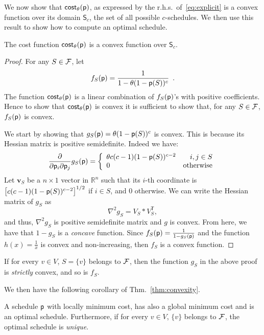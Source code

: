We now show that $\mathsf{cost}_\theta(\mathsf{p})$, as expressed by the r.h.s.~of~\eqref{eq:explicit}
is a convex function over its domain $\mathsf{S}_c$, the set of all possible
$c$-schedules. We then use this result to show how to compute an optimal schedule.

\begin{theorem}\label{thm:convexity}
	The cost function $\mathsf{cost}_\theta(\mathsf{p})$ is a convex function over
	$\mathsf{S}_c$.
\end{theorem}
\begin{proof}
	For any $S\in\mathcal{F}$, let
	\[
		f_S(\mathsf{p}) = \frac{1}{1 - \theta(1-\mathsf{p}(S))^c}\enspace.
	\]
	The function $\mathsf{cost}_\theta(\mathsf{p})$ is a linear combination of
	$f_S(\mathsf{p})$'s with positive coefficients. Hence to show that
	$\mathsf{cost}_\theta(\mathsf{p})$ is convex it is sufficient to show that, for any
	$S\in\mathcal{F}$, $f_S(\mathsf{p})$ is convex.

	We start by showing that $g_S(\mathsf{p}) = \theta(1-\mathsf{p}(S))^c$ is convex.
	This is because its Hessian matrix is positive semidefinite. Indeed we have:
	\[
		\frac{\partial}{\partial \mathsf{p}_i \partial \mathsf{p}_j} g_S(\mathsf{p})=\left\{
		\begin{array}{lr}
		\theta c(c-1) (1-\mathsf{p}(S))^{c-2} &  i,j \in S\\
		0 &  \text{otherwise}
		\end{array}
		\right.
	\]
	Let $\mathbf{v}_S$ be a $n\times 1$ vector in $\mathbb{R}^n$ such that its
	$i$-th coordinate is $\left[c(c-1) (1-\mathsf{p}(S))^{c-2} \right]^{1/2}$ if $i\in
	S$, and $0$ otherwise. We can write the Hessian matrix of $g_S$ as
	\[
		\nabla^2 g_S = V_S * V_S^\mathsf{T},
	\]
	and thus, $\nabla^2 g_S$ is positive semidefinite matrix and $g$ is convex.
	From here, we have that $1-g_S$ is a \emph{concave} function. Since
	$f_S(\mathsf{p})=\frac{1}{1-g_S(\mathsf{p})}$ and the function $h(x)=\frac{1}{x}$ is
	convex and non-increasing, then $f_S$ is a convex function.
\end{proof}

If for every $v\in V$, $S=\{v\}$ belongs to $\mathcal{F}$, then the
function $g_S$ in the above proof is \emph{strictly} convex, and so is $f_S$.

We then have the following corollary of Thm.~\ref{thm:convexity}.
\begin{corollary}
	A schedule $\mathsf{p}$ with locally minimum cost, has also a global minimum cost
	and is an optimal schedule. Furthermore, if for every $v\in V$, $\{v\}$
	belongs to $\mathcal{F}$, the optimal schedule is \emph{unique}.
\end{corollary}

